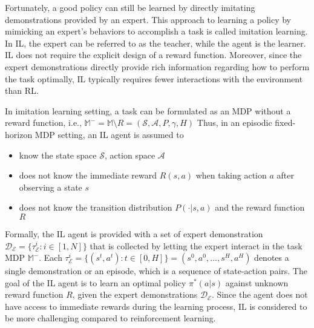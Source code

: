 
Fortunately,
a good policy can still be learned by directly imitating demonstrations provided by an expert.
This approach to learning a policy by mimicking an expert's behaviors to accomplish a task is called imitation learning.
In IL,
the expert can be referred to as the teacher,
while the agent is the learner.
IL does not require the explicit design of a reward function.
Moreover,
since the expert demonstrations directly provide rich information regarding how to perform the task optimally,
IL typically requires fewer interactions with the environment than RL.

In imitation learning setting,
a task can be formulated as an MDP without a reward function,
i.e.,
$\mathbb{M}^- = \mathbb{M} \setminus R = (\mathcal{S},\mathcal{A},P,\gamma,H)$
Thus,
in an episodic fixed-horizon MDP setting,
an IL agent is assumed to

\begin{itemize}
  \item know the state space $\mathcal{S}$,
        action space $\mathcal{A}$
  \item does not know the immediate reward $R(s,a)$ when taking action $a$ after observing a state $s$
  \item does not know the transition distribution $P(\cdot|s,a)$ and the reward function $R$
\end{itemize}

Formally,
the IL agent is provided with a set of expert demonstration $\mathcal{D}_\mathcal{E} = \{ \tau^i_\mathcal{E} : i \in [1,N] \}$ that is collected by letting the expert interact in the task MDP $\mathbb{M}^-$.
Each $\tau^i_\mathcal{E} = \{ (s^t,a^t):t \in [0,H] \} = (s^0,a^0,\dots,s^H,a^H)$ denotes a single demonstration or an episode,
which is a sequence of state-action pairs.
The goal of the IL agent is to learn an optimal policy $\pi^*(a|s)$ against unknown reward function $R$,
given the expert demonstrations $\mathcal{D}_\mathcal{E}$.
Since the agent does not have access to immediate rewards during the learning process,
IL is considered to be more challenging compared to reinforcement learning.

